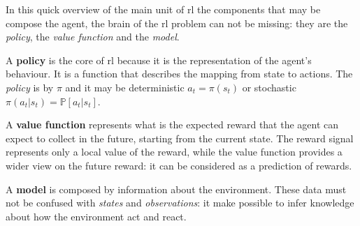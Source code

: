 
In this quick overview of the main unit of \gls{rl} the components that may be compose the agent, the brain of the \gls{rl} problem can not be missing: they are the \textit{policy}, the \textit{value function} and the \textit{model}.

A \textbf{policy} is the core of \gls{rl} because it is the representation of the agent's behaviour. It is a function that describes the mapping from state to actions.  The \textit{policy} is by $\pi$ and it may be deterministic  $a_t = \pi(s_t)$  or stochastic $\pi(a_t|s_t) = \mathbb{P}[a_t | s_t]$.

A \textbf{value function} represents what is the expected reward that the agent can expect to collect in the future, starting from the current state. The reward signal represents only a local value of the reward, while the value function provides a wider view on the future reward: it can be considered as a prediction of rewards.

A \textbf{model} is composed by information about the environment. These data must not be confused with \textit{states} and \textit{observations}: it make possible to infer knowledge about how the environment act and react.




